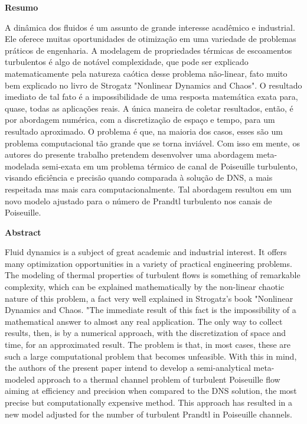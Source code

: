 \begin{huge}
\textbf{Resumo}
\\

\end{huge}

\noindent
	
	A dinâmica dos fluidos é um assunto de grande interesse acadêmico e industrial. Ele oferece
	muitas oportunidades de otimização em uma variedade de problemas práticos de engenharia.
	A modelagem de propriedades térmicas de escoamentos turbulentos é algo de notável
	complexidade, que pode ser explicado matematicamente pela natureza caótica desse problema
	não-linear, fato muito bem explicado no livro de Strogatz "Nonlinear Dynamics and
	Chaos". O resultado imediato de tal fato é a impossibilidade de uma resposta matemática
	exata para, quase, todas as aplicações reais. A única maneira de coletar resultados, então, é
	por abordagem numérica, com a discretização de espaço e tempo, para um resultado aproximado.
	O problema é que, na maioria dos casos, esses são um problema computacional tão
	grande que se torna inviável. Com isso em mente, os autores do presente trabalho pretendem
	desenvolver uma abordagem meta-modelada semi-exata em um problema térmico de canal
	de Poiseuille turbulento, visando eficiência e precisão quando comparada à solução de DNS,
	a mais respeitada mas mais cara computacionalmente. Tal abordagem resultou em um novo
	modelo ajustado para o número de Prandtl turbulento nos canais de Poiseuille.

\newpage

\begin{huge}
	\textbf{Abstract}
	\\
	
\end{huge}

\noindent

Fluid dynamics is a subject of great academic and industrial interest. It offers
many optimization opportunities in a variety of practical engineering problems.
The modeling of thermal properties of turbulent flows is something of remarkable
complexity, which can be explained mathematically by the non-linear chaotic nature of this problem, 
a fact very well explained in Strogatz's book "Nonlinear Dynamics and
Chaos. "The immediate result of this fact is the impossibility of a mathematical answer
to almost any real application. The only way to collect results, then, is
by a numerical approach, with the discretization of space and time, for an approximated result.
The problem is that, in most cases, these are such a large computational problem that becomes unfeasible. 
With this in mind, the authors of the present paper intend
to develop a semi-analytical meta-modeled approach to a thermal channel problem
of turbulent Poiseuille flow aiming at efficiency and precision when compared to the DNS solution,
the most precise but computationally expensive method. This approach has resulted in a new
model adjusted for the number of turbulent Prandtl in Poiseuille channels.

\newpage